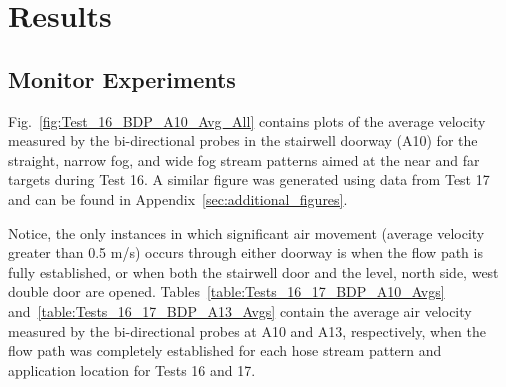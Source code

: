 \documentclass[12pt,oneside]{book}
\begin{document}

\chapter{Results}
\label{chap:Results}

\section{Monitor Experiments}
\label{sec:monitor_results}

Fig.~\ref{fig:Test_16_BDP_A10_Avg_All} contains plots of the average velocity measured by the bi-directional probes in the stairwell doorway (A10) for the straight, narrow fog, and wide fog stream patterns aimed at the near and far targets during Test 16. A similar figure was generated using data from Test 17 and can be found in Appendix~\ref{sec:additional_figures}.

Notice, the only instances in which significant air movement (average velocity greater than 0.5 m/s) occurs through either doorway is when the flow path is fully established, or when both the stairwell door and the  level, north side, west double door are opened. Tables~\ref{table:Tests_16_17_BDP_A10_Avgs} and~\ref{table:Tests_16_17_BDP_A13_Avgs} contain the average air velocity measured by the bi-directional probes at A10 and A13, respectively, when the flow path was completely established for each hose stream pattern and application location for Tests 16 and 17.


\clearpage
\end{document}
